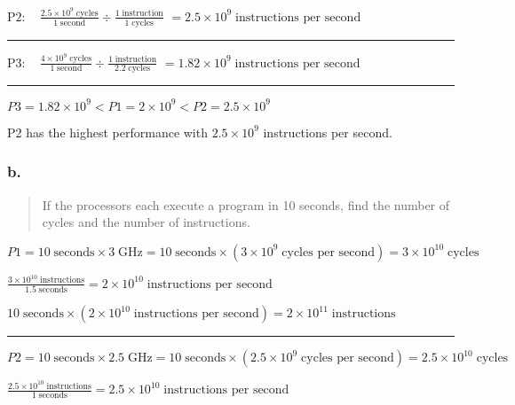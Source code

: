 \documentclass[]{article}
\begin{document}
\(\text{P2}: \quad \frac{2.5 \times 10^9 \;\text{cycles}}{1 \;\text{second}} \div \frac{1  \; \text{instruction}}{1 \; \text{cycles}}\)
\(=2.5 \times 10^9 \; \text{instructions per second}\)

\begin{center}\rule{0.5\linewidth}{\linethickness}\end{center}

\(\text{P3}: \quad \frac{4 \times 10^9 \;\text{cycles}}{1 \;\text{second}} \div \frac{1  \; \text{instruction}}{2.2 \; \text{cycles}}\)
\(=1.82 \times 10^9 \; \text{instructions per second}\)

\begin{center}\rule{0.5\linewidth}{\linethickness}\end{center}

\(P3 = 1.82 \times 10^9 < P1 = 2 \times 10^9 < P2 = 2.5 \times 10^9\)

P2 has the highest performance with \(2.5  \times 10^9\) instructions
per second.

\subsubsection{b.}\label{header-n4742}

\begin{quote}
If the processors each execute a program in 10 seconds, find the number
of cycles and the number of instructions.
\end{quote}

\(P1 = 10 \; \text{seconds} \times 3 \; \text{GHz} = 10 \; \text{seconds} \times (3 \times 10^9 \; \text{cycles per second}) = 3 \times 10^{10} \; \text{cycles}\)

\(\frac{3 \times 10^{10} \; \text{instructions}}{1.5 \; \text{seconds}} = 2 \times 10^{10} \; \text{instructions per second}\)

\(10 \;\text{seconds} \times (2 \times 10^{10} \;\text{instructions per second}) = 2 \times 10^{11} \;\text{instructions}\)

\begin{center}\rule{0.5\linewidth}{\linethickness}\end{center}

\(P2 = 10 \; \text{seconds} \times 2.5 \; \text{GHz} = 10 \; \text{seconds} \times (2.5 \times 10^9 \; \text{cycles per second}) = 2.5 \times 10^{10} \; \text{cycles}\)

\(\frac{2.5 \times 10^{10} \; \text{instructions}}{1 \; \text{seconds}} = 2.5 \times 10^{10} \; \text{instructions per second}\)
\end{document}
